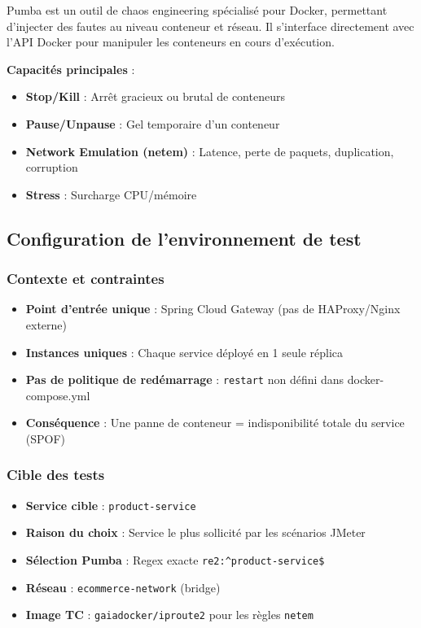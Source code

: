 Pumba est un outil de chaos engineering spécialisé pour Docker, permettant d'injecter des fautes au niveau conteneur et réseau. Il s'interface directement avec l'API Docker pour manipuler les conteneurs en cours d'exécution.

\textbf{Capacités principales} :
\begin{itemize}
    \item \textbf{Stop/Kill} : Arrêt gracieux ou brutal de conteneurs
    \item \textbf{Pause/Unpause} : Gel temporaire d'un conteneur
    \item \textbf{Network Emulation (netem)} : Latence, perte de paquets, duplication, corruption
    \item \textbf{Stress} : Surcharge CPU/mémoire
\end{itemize}

\subsection{Configuration de l'environnement de test}

\subsubsection{Contexte et contraintes}

\begin{itemize}
    \item \textbf{Point d'entrée unique} : Spring Cloud Gateway (pas de HAProxy/Nginx externe)
    \item \textbf{Instances uniques} : Chaque service déployé en 1 seule réplica
    \item \textbf{Pas de politique de redémarrage} : \texttt{restart} non défini dans docker-compose.yml
    \item \textbf{Conséquence} : Une panne de conteneur = indisponibilité totale du service (SPOF)
\end{itemize}

\subsubsection{Cible des tests}

\begin{itemize}
    \item \textbf{Service cible} : \texttt{product-service}
    \item \textbf{Raison du choix} : Service le plus sollicité par les scénarios JMeter
    \item \textbf{Sélection Pumba} : Regex exacte \texttt{re2:\^{}product-service\$}
    \item \textbf{Réseau} : \texttt{ecommerce-network} (bridge)
    \item \textbf{Image TC} : \texttt{gaiadocker/iproute2} pour les règles \texttt{netem}
\end{itemize}

